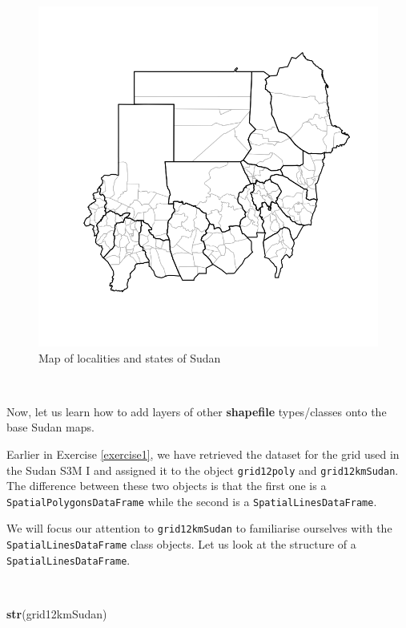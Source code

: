 \documentclass[12pt,a4paper,a4paper]{book}
\newenvironment{Shaded}{\begin{snugshade}}{\end{snugshade}}
\newcommand{\KeywordTok}[1]{\textcolor[rgb]{0.13,0.29,0.53}{\textbf{#1}}}
\newcommand{\NormalTok}[1]{#1}
\theoremstyle{definition}
\theoremstyle{definition}
\theoremstyle{definition}
\theoremstyle{remark}
\begin{document}
\begin{figure}[H]

{\centering \includegraphics{figures/map3-1} 

}

\caption{Map of localities and states of Sudan}\label{fig:map3}
\end{figure}

~

Now, let us learn how to add layers of other \textbf{shapefile}
types/classes onto the base Sudan maps.

Earlier in Exercise \ref{exercise1}, we have retrieved the dataset for
the grid used in the Sudan S3M I and assigned it to the object
\texttt{grid12poly} and \texttt{grid12kmSudan}. The difference between
these two objects is that the first one is a
\texttt{SpatialPolygonsDataFrame} while the second is a
\texttt{SpatialLinesDataFrame}.

We will focus our attention to \texttt{grid12kmSudan} to familiarise
ourselves with the \texttt{SpatialLinesDataFrame} class objects. Let us
look at the structure of a \texttt{SpatialLinesDataFrame}.

~

\begin{Shaded}
\begin{Highlighting}[]
\KeywordTok{str}\NormalTok{(grid12kmSudan)}
\end{Highlighting}
\end{Shaded}
\end{document}
